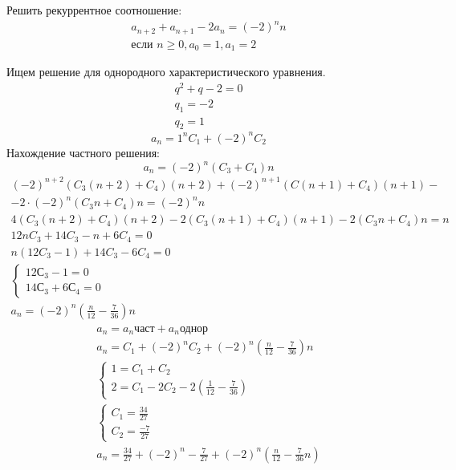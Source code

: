\begin{task}
    Решить рекуррентное соотношение:
    \begin{gather*}
        a_{n+2} + a_{n+1} - 2a_n = (-2)^nn \\
        \text{если } n \geq 0, a_0=1, a_1=2
    \end{gather*}
    \begin{solution}
        Ищем решение для однородного характеристического уравнения.
        \begin{gather*}
            q^2+q-2=0 \\
            q_1 = -2 \\
            q_2 = 1
        \end{gather*}
        \begin{equation*}
            a_n = 1^n C_1 + (-2)^n C_2
        \end{equation*}
        Нахождение частного решения:
        \begin{equation*}
            a_n = (-2)^n (C_3 + C_4)n
        \end{equation*}
        \begin{multline*}
            (-2)^{n+2}(C_3(n+2)+C_4)(n+2) + (-2)^{n+1}(C(n+1)+C_4)(n+1) - \\
            - 2 \cdot (-2)^n (C_3n + C_4)n = (-2)^nn 
        \end{multline*}
        \begin{gather*}
            4(C_3(n+2)+C_4)(n+2)-2(C_3(n+1)+C_4)(n+1)-2(C_3n+C_4)n = n \\
            12nC_3 + 14C_3 - n + 6C_4 = 0 \\
            n(12C_3 - 1) + 14C_3 - 6C_4 = 0 \\
            \begin{cases}
                12С_3 - 1 = 0 \\
                14С_3 + 6С_4=0 
            \end{cases} \\
            a_n = (-2)^n \left(\frac{n}{12} - \frac{7}{36}\right)n
        \end{gather*}
        \begin{gather*}
            a_n = a_n\text{част} + a_n\text{однор} \\
            a_n = C_1 + (-2)^nC_2 + (-2)^n\left(\frac{n}{12} - \frac{7}{36}\right)n \\
            \begin{cases}
                1 = C_1 + C_2 \\
                2 = C_1 - 2C_2 - 2\left(\frac{1}{12}-\frac{7}{36}\right)
            \end{cases} \\
            \begin{cases}
                C_1 = \frac{34}{27} \\
                C_2 = \frac{-7}{27}
            \end{cases} \\
            a_n = \frac{34}{27}+(-2)^n -\frac{7}{27} + (-2)^n \left(\frac{n}{12}-\frac{7}{36}n\right)
        \end{gather*}
    \end{solution}
\end{task}

